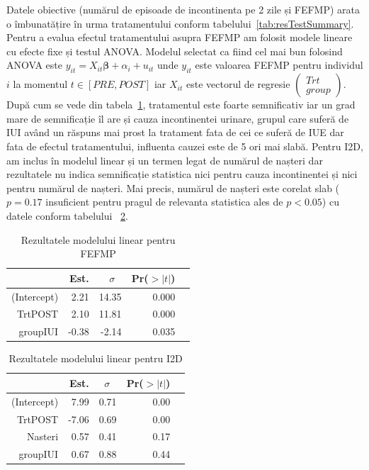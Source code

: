 \documentclass[12pt,draft]{article}
\begin{document}
  Datele obiective (numărul de episoade de incontinenta pe 2 zile și \ac{FEFMP}) arata o îmbunatățire în urma tratamentului conform tabelului~\ref{tab:resTestSummary}. Pentru a evalua efectul tratamentului asupra \ac{FEFMP} am folosit modele lineare cu efecte fixe și testul ANOVA. Modelul selectat ca fiind cel mai bun folosind ANOVA este $y_{it} = X_{it}\mathbf{\beta}+\alpha_{i}+u_{it}$ unde $y_{it}$ este valoarea FEFMP pentru individul $i$ la momentul $t \in [PRE,POST]$ iar $X_{it}$ este vectorul de regresie $\left(\!\begin{array}{c}Trt\\group\end{array}\right)$. După cum se vede din tabela~\ref{tab:resFEFMPlm}, tratamentul este foarte semnificativ iar un grad mare de semnificație îl are și cauza incontinentei urinare, grupul care suferă de \ac{IUI} având un răspuns mai prost la tratament fata de cei ce suferă de \ac{IUE} dar fata de efectul tratamentului, influenta cauzei este de 5 ori mai slabă.
  Pentru I2D, am inclus în modelul linear și un termen legat de numărul de nașteri dar rezultatele nu indica semnificație statistica nici pentru cauza incontinentei și nici pentru numărul de nașteri. Mai precis, numărul de nașteri este corelat slab ($p=0.17$ insuficient pentru pragul de  relevanta statistica ales de $p<0.05$) cu datele conform tabelului~ \ref{tab:resI2Dlm}.
  \begin{table}[H]
		\centering
		\begin{tabular}{rrrrr}
			\hline
			& Est. & $\sigma~~~$ & Pr($>|t|$) \\ \hline
			(Intercept) & 2.21 & 14.35 & 0.000 \\ 
			TrtPOST & 2.10  & 11.81 & 0.000 \\ 
			groupIUI & -0.38 & -2.14 & 0.035 \\ \hline
		\end{tabular}
		\caption{Rezultatele modelului linear pentru FEFMP} 
		\label{tab:resFEFMPlm}
	\end{table}
  
	\begin{table}[H]
		\centering
		\begin{tabular}{rrrrr}
			\hline
			& Est. & $\sigma~~~$ & Pr($>|t|$) \\ \hline
			(Intercept) & 7.99 & 0.71 & 0.00 \\ 
			TrtPOST & -7.06 & 0.69 & 0.00 \\ 
			Nasteri & 0.57 & 0.41 & 0.17 \\
			groupIUI & 0.67 & 0.88 & 0.44 \\ \hline
		\end{tabular}
		\caption{Rezultatele modelului linear pentru I2D} 
		\label{tab:resI2Dlm}
	\end{table}
\end{document}
